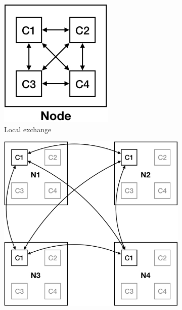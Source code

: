 \documentclass[10]{report}
\begin{document}
\begin{figure}
	\begin{center}
		\begin{subfigure}{0.44\linewidth}
			\centerline{\includegraphics[width=1.0\columnwidth]{local}}
			\caption{Local exchange \label{fig:local_exchange}}
		\end{subfigure}%
		\hspace{1em}%
		\begin{subfigure}{0.53\linewidth}
			\centerline{\includegraphics[width=1.0\columnwidth]{remote}}

\end{subfigure}
\end{center}
\end{figure}
\end{document}
